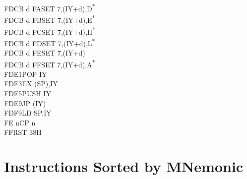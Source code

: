 \documentclass[oneside,a4paper]{book}
\begin{document}
\begin{multicols}{3}
{\begin{tabbing}
FDCB d FA\>SET 7,(IY+d),D\textsuperscript{*}\\
FDCB d FB\>SET 7,(IY+d),E\textsuperscript{*}\\
FDCB d FC\>SET 7,(IY+d),H\textsuperscript{*}\\
FDCB d FD\>SET 7,(IY+d),L\textsuperscript{*}\\
FDCB d FE\>SET 7,(IY+d)\\
FDCB d FF\>SET 7,(IY+d),A\textsuperscript{*}\\
FDE1\>POP IY\\
FDE3\>EX (SP),IY\\
FDE5\>PUSH IY\\
FDE9\>JP (IY)\\
FDF9\>LD SP,IY\\
FE n\>CP n\\
FF\>RST 38H
\end{tabbing}
}
\end{multicols}
\normalsize




\chapter{Instructions Sorted by MNemonic}
\end{document}
